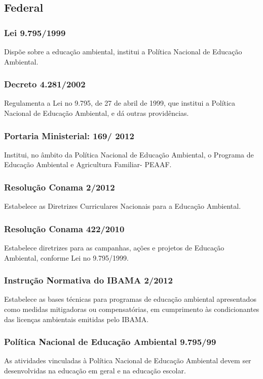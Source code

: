 \begin{subapend}
	\subsection{Federal}
	\begin{subsubapend}
		\subsubsection{Lei 9.795/1999}
		Dispõe sobre a educação ambiental, institui a Política Nacional de Educação Ambiental.
		\subsubsection{Decreto 4.281/2002}
		Regulamenta a Lei no 9.795, de 27 de abril de 1999, que institui a Política Nacional de Educação Ambiental, e dá outras providências.
		\subsubsection{Portaria Ministerial: 169/ 2012}
		Institui, no âmbito da Política Nacional de Educação Ambiental, o Programa de Educação Ambiental e Agricultura Familiar- PEAAF.
		\subsubsection{Resolução Conama 2/2012}
		Estabelece as Diretrizes Curriculares Nacionais para a Educação Ambiental.
		\subsubsection{Resolução Conama 422/2010}
		Estabelece diretrizes para as campanhas, ações e projetos de Educação Ambiental, conforme Lei no 9.795/1999.
		\subsubsection{Instrução Normativa do IBAMA 2/2012}
		Estabelece as bases técnicas para programas de educação ambiental apresentados como medidas mitigadoras ou compensatórias, em cumprimento às condicionantes das licenças ambientais emitidas pelo IBAMA.
		\subsubsection{Política Nacional de Educação Ambiental 9.795/99}
		As atividades vinculadas à Política Nacional de Educação Ambiental devem ser desenvolvidas na educação em geral e na educação escolar.

\end{subsubapend}
\end{subapend}
